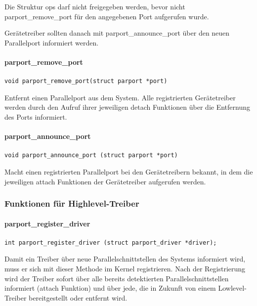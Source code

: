 \documentclass[a4paper,11pt]{article}
\begin{document}
Die Struktur ops darf nicht freigegeben werden, bevor nicht parport\_remove\_port für den
angegebenen Port aufgerufen wurde.

Gerätetreiber sollten danach mit parport\_announce\_port über den neuen Parallelport informiert
werden.

\paragraph{parport\_remove\_port}
\begin{verbatim}
void parport_remove_port(struct parport *port)
\end{verbatim}

Entfernt einen Parallelport aus dem System. Alle registrierten Gerätetreiber werden durch den
Aufruf ihrer jeweiligen detach Funktionen über die Entfernung des Ports informiert.

\paragraph{parport\_announce\_port}
\begin{verbatim}
void parport_announce_port (struct parport *port)
\end{verbatim}

Macht einen registrierten Parallelport bei den Gerätetreibern bekannt, in dem die jeweiligen
attach Funktionen der Gerätetreiber aufgerufen werden.

\subsubsection{Funktionen für Highlevel-Treiber}

\paragraph{parport\_register\_driver}

\begin{verbatim}
int parport_register_driver (struct parport_driver *driver);
\end{verbatim}

Damit ein Treiber über neue Parallelschnittstellen des Systems informiert wird, muss er
sich mit dieser Methode im Kernel registrieren. Nach der Registrierung wird der Treiber
sofort über alle bereits detektierten Parallelschnittstellen informiert (attach Funktion)
und über jede, die in Zukunft von einem Lowlevel-Treiber bereitgestellt oder entfernt wird.
\end{document}
